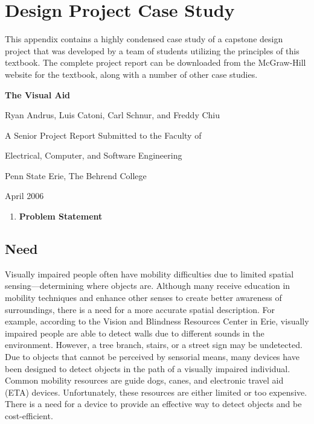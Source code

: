 \section{\texorpdfstring{Design Project Case Study
}{Design Project Case Study }}\label{design-project-case-study}

This appendix contains a highly condensed case study of a capstone
design project that was developed by a team of students utilizing the
principles of this textbook. The complete project report can be
downloaded from the McGraw-Hill website for the textbook, along with a
number of other case studies.

\textbf{The Visual Aid}

Ryan Andrus, Luis Catoni, Carl Schnur, and Freddy Chiu

A Senior Project Report Submitted to the Faculty of

Electrical, Computer, and Software Engineering

Penn State Erie, The Behrend College

April 2006

\begin{enumerate}
\def\labelenumi{\arabic{enumi}.}
\item
  \textbf{Problem Statement}
\end{enumerate}

\subsection{Need}\label{need}

Visually impaired people often have mobility difficulties due to limited
spatial sensing---determining where objects are. Although many receive
education in mobility techniques and enhance other senses to create
better awareness of surroundings, there is a need for a more accurate
spatial description. For example, according to the Vision and Blindness
Resources Center in Erie, visually impaired people are able to detect
walls due to different sounds in the environment. However, a tree
branch, stairs, or a street sign may be undetected. Due to objects that
cannot be perceived by sensorial means, many devices have been designed
to detect objects in the path of a visually impaired individual. Common
mobility resources are guide dogs, canes, and electronic travel aid
(ETA) devices. Unfortunately, these resources are either limited or too
expensive. There is a need for a device to provide an effective way to
detect objects and be cost-efficient.

